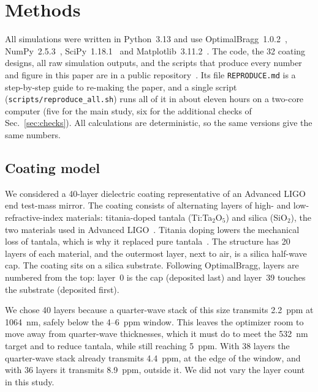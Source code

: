 \section{Methods}

All simulations were written in Python~3.13 and use OptimalBragg~1.0.2~\cite{Venugopalan2024}, NumPy~2.5.3~\cite{Harris2020}, SciPy~1.18.1~\cite{Virtanen2020} and Matplotlib~3.11.2~\cite{Hunter2007}. The code, the 32 coating designs, all raw simulation outputs, and the scripts that produce every number and figure in this paper are in a public repository~\cite{Repo}. Its file \texttt{REPRODUCE.md} is a step-by-step guide to re-making the paper, and a single script (\texttt{scripts/reproduce\_all.sh}) runs all of it in about eleven hours on a two-core computer (five for the main study, six for the additional checks of Sec.~\ref{sec:checks}). All calculations are deterministic, so the same versions give the same numbers.

\subsection{Coating model}

We considered a 40-layer dielectric coating representative of an Advanced LIGO end test-mass mirror. The coating consists of alternating layers of high- and low-refractive-index materials: titania-doped tantala (Ti:Ta$_2$O$_5$) and silica (SiO$_2$), the two materials used in Advanced LIGO~\cite{aLIGO2015,Pinard2017}. Titania doping lowers the mechanical loss of tantala, which is why it replaced pure tantala~\cite{Harry2007}. The structure has 20 layers of each material, and the outermost layer, next to air, is a silica half-wave cap. The coating sits on a silica substrate. Following OptimalBragg, layers are numbered from the top: layer~0 is the cap (deposited last) and layer~39 touches the substrate (deposited first).

We chose 40 layers because a quarter-wave stack of this size transmits 2.2~ppm at 1064~nm, safely below the 4--6~ppm window. This leaves the optimizer room to move away from quarter-wave thicknesses, which it must do to meet the 532~nm target and to reduce tantala, while still reaching 5~ppm. With 38 layers the quarter-wave stack already transmits 4.4~ppm, at the edge of the window, and with 36 layers it transmits 8.9~ppm, outside it. We did not vary the layer count in this study.

